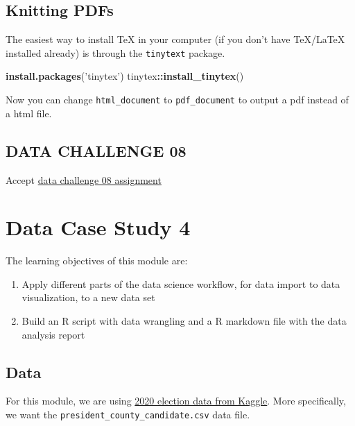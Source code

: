 \documentclass[
]{book}
\newenvironment{Shaded}{\begin{snugshade}}{\end{snugshade}}
\newcommand{\KeywordTok}[1]{\textcolor[rgb]{0.13,0.29,0.53}{\textbf{#1}}}
\newcommand{\NormalTok}[1]{#1}
\newcommand{\OperatorTok}[1]{\textcolor[rgb]{0.81,0.36,0.00}{\textbf{#1}}}
\newcommand{\StringTok}[1]{\textcolor[rgb]{0.31,0.60,0.02}{#1}}
\begin{document}
\hypertarget{knitting-pdfs}{%
\section{Knitting PDFs}\label{knitting-pdfs}}

The easiest way to install TeX in your computer (if you don't have TeX/LaTeX installed already) is through the \texttt{tinytext} package.

\begin{Shaded}
\begin{Highlighting}[]
\KeywordTok{install.packages}\NormalTok{(}\StringTok{'tinytex'}\NormalTok{)}
\NormalTok{tinytex}\OperatorTok{::}\KeywordTok{install_tinytex}\NormalTok{()}
\end{Highlighting}
\end{Shaded}

Now you can change \texttt{html\_document} to \texttt{pdf\_document} to output a pdf instead of a html file.

\hypertarget{data-challenge-08-1}{%
\section{DATA CHALLENGE 08}\label{data-challenge-08-1}}

Accept \href{}{data challenge 08 assignment}

\hypertarget{data-case-study-4}{%
\chapter{Data Case Study 4}\label{data-case-study-4}}

The learning objectives of this module are:

\begin{enumerate}
\def\labelenumi{\arabic{enumi}.}
\item
  Apply different parts of the data science workflow, for data import to data visualization, to a new data set
\item
  Build an R script with data wrangling and a R markdown file with the data analysis report
\end{enumerate}

\hypertarget{data}{%
\section{Data}\label{data}}

For this module, we are using \href{https://www.kaggle.com/unanimad/us-election-2020?select=president_county_candidate.csv}{2020 election data from Kaggle}. More specifically, we want the \texttt{president\_county\_candidate.csv} data file.
\end{document}
